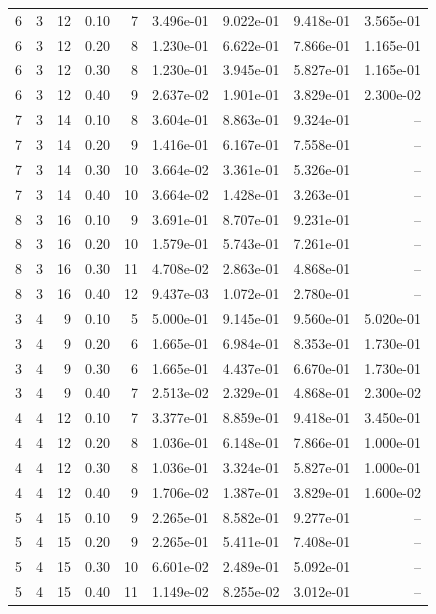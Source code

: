 \begin{landscape}
\begin{longtable}{rrrrrrrrr}
6 & 3 & 12 & 0.10 & 7 & 3.496e-01 & 9.022e-01 & 9.418e-01 & 3.565e-01 \\
6 & 3 & 12 & 0.20 & 8 & 1.230e-01 & 6.622e-01 & 7.866e-01 & 1.165e-01 \\
6 & 3 & 12 & 0.30 & 8 & 1.230e-01 & 3.945e-01 & 5.827e-01 & 1.165e-01 \\
6 & 3 & 12 & 0.40 & 9 & 2.637e-02 & 1.901e-01 & 3.829e-01 & 2.300e-02 \\
7 & 3 & 14 & 0.10 & 8 & 3.604e-01 & 8.863e-01 & 9.324e-01 & -- \\
7 & 3 & 14 & 0.20 & 9 & 1.416e-01 & 6.167e-01 & 7.558e-01 & -- \\
7 & 3 & 14 & 0.30 & 10 & 3.664e-02 & 3.361e-01 & 5.326e-01 & -- \\
7 & 3 & 14 & 0.40 & 10 & 3.664e-02 & 1.428e-01 & 3.263e-01 & -- \\
8 & 3 & 16 & 0.10 & 9 & 3.691e-01 & 8.707e-01 & 9.231e-01 & -- \\
8 & 3 & 16 & 0.20 & 10 & 1.579e-01 & 5.743e-01 & 7.261e-01 & -- \\
8 & 3 & 16 & 0.30 & 11 & 4.708e-02 & 2.863e-01 & 4.868e-01 & -- \\
8 & 3 & 16 & 0.40 & 12 & 9.437e-03 & 1.072e-01 & 2.780e-01 & -- \\
3 & 4 & 9 & 0.10 & 5 & 5.000e-01 & 9.145e-01 & 9.560e-01 & 5.020e-01 \\
3 & 4 & 9 & 0.20 & 6 & 1.665e-01 & 6.984e-01 & 8.353e-01 & 1.730e-01 \\
3 & 4 & 9 & 0.30 & 6 & 1.665e-01 & 4.437e-01 & 6.670e-01 & 1.730e-01 \\
3 & 4 & 9 & 0.40 & 7 & 2.513e-02 & 2.329e-01 & 4.868e-01 & 2.300e-02 \\
4 & 4 & 12 & 0.10 & 7 & 3.377e-01 & 8.859e-01 & 9.418e-01 & 3.450e-01 \\
4 & 4 & 12 & 0.20 & 8 & 1.036e-01 & 6.148e-01 & 7.866e-01 & 1.000e-01 \\
4 & 4 & 12 & 0.30 & 8 & 1.036e-01 & 3.324e-01 & 5.827e-01 & 1.000e-01 \\
4 & 4 & 12 & 0.40 & 9 & 1.706e-02 & 1.387e-01 & 3.829e-01 & 1.600e-02 \\
5 & 4 & 15 & 0.10 & 9 & 2.265e-01 & 8.582e-01 & 9.277e-01 & -- \\
5 & 4 & 15 & 0.20 & 9 & 2.265e-01 & 5.411e-01 & 7.408e-01 & -- \\
5 & 4 & 15 & 0.30 & 10 & 6.601e-02 & 2.489e-01 & 5.092e-01 & -- \\
5 & 4 & 15 & 0.40 & 11 & 1.149e-02 & 8.255e-02 & 3.012e-01 & -- \\

\end{longtable}
\end{landscape}
